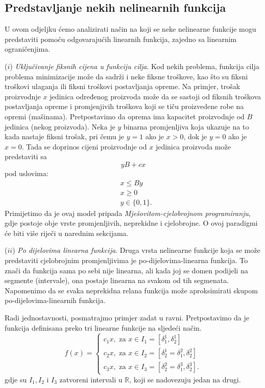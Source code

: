 \documentclass[a4paper, utf8, 11pt, colorlinks]{book}
\theoremstyle{definition}
\begin{document}

\subsection{Predstavljanje nekih nelinearnih funkcija} 

U ovom odjeljku ćemo analizirati način na koji se neke nelinearne funkcije mogu predstaviti pomoću odgovarajućih linearnih funkcija, zajedno sa linearnim ograničenjima. 

($i$) \emph{Uključivanje fiksnih cijena u funkciju cilja}. Kod nekih problema, funkcija cilja problema minimizacije može da sadrži i neke fiksne troškove, kao što su fiksni troškovi ulaganja ili fiksni troškovi postavljanja opreme. Na primjer, trošak proizvodnje $x$ jedinica određenog proizvoda može da se sastoji od fiksnih troškova postavljanja opreme i promjenjivih troškova koji se tiču proizvedene robe na opremi (mašinama). Pretpostavimo da oprema ima kapacitet proizvodnje od $B$ jedinica (nekog proizvoda). Neka je $y$ binarna promjenljiva koja ukazuje na to kada nastaje fiksni trošak, pri čemu  je $y=1$ ako je $x >0$, dok je $y=0$ ako je $x=0$. Tada se doprinos cijeni proizvodnje od $x$ jedinica proizvoda može predstaviti sa
$$ yB + c x $$ pod uslovima:
\begin{align}
     &x \leq By \\
     & x \geq 0 \\
     & y \in \{0, 1\}.
\end{align}
Primijetimo da je ovaj model pripada \emph{Mješovitom-cjelobrojnom programiranju}, gdje postoje obje vrste promjenljivih, neprekidne i cjelobrojne. O ovoj paradigmi će biti više riječi u narednim sekcijama. 

($ii$) \emph{{Po dijelovima linearna funkcija}}. Druga vrsta nelinearne funkcije koja se može predstaviti cjelobrojnim promjenljivima je po-dijelovima-linearna funkcija.  To znači da funkcija sama po sebi nije linearna, ali kada joj se domen podijeli na segmente (intervale), ona postaje linearna na svakom od tih segmenata. Napomenimo da se svaka neprekidna relana funkcija može aproksimirati skupom po-dijelovima-linearnih funkcija.  

Radi jednostavnosti, posmatrajmo primjer zadat u ravni. Pretpostavimo da je funkcija definisana preko tri linearne funkcije na sljedeći način.
$$f(x) = \begin{cases}
          c_1 x, \mbox{ za } x \in I_1 = [\delta^1_1, \delta^1_2] \\
          c_2 x, \mbox{ za } x \in I_2 = [\delta^1_2 = \delta^2_1, \delta^2_2] \\
          c_3 x, \mbox{ za } x \in I_3 = [\delta^2_2 = \delta^3_1, \delta^3_2].
      \end{cases}
$$
gdje su $I_1, I_2$ i $I_3$  zatvoreni intervali u $\mathbb{R}$, koji se nadovezuju jedan na drugi.
\end{document}
